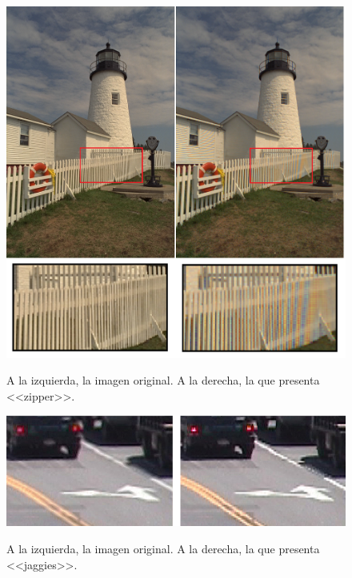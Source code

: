 \documentclass[a4paper]{article}
\begin{document}
\newpage

\begin{figure}[h!]
	\caption{A la izquierda, la imagen original. A la derecha, la que presenta <<zipper>>.}
	\begin{center}
	\includegraphics[scale=0.50]{imagenes/zipper}
	\label{zipper}
  \end{center}
\end{figure}

\begin{figure}[h!]
	\caption{A la izquierda, la imagen original. A la derecha, la que presenta <<jaggies>>.}
	\begin{center}
	\includegraphics[scale=0.50]{imagenes/jaggies}
	\label{jaggies}
  \end{center}
\end{figure}

\newpage
\end{document}
